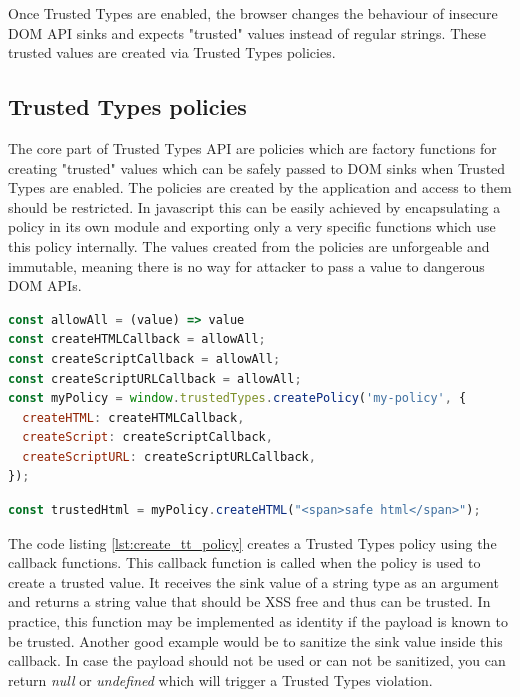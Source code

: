 Once Trusted Types are enabled, the browser changes the behaviour of insecure DOM API sinks and
expects "trusted" values instead of regular strings. These trusted values are created via Trusted
Types policies.

\subsection{Trusted Types policies}
\label{subsec:tt_policy}

The core part of Trusted Types API are policies which are factory functions for creating "trusted"
values which can be safely passed to DOM sinks when Trusted Types are enabled. The policies are
created by the application and access to them should be restricted. In javascript this can be easily
achieved by encapsulating a policy in its own module and exporting only a very specific functions
which use this policy internally. The values created from the policies are unforgeable and
immutable, meaning there is no way for attacker to pass a value to dangerous DOM APIs.

\bigskip
\begin{lstlisting}[language=JavaScript, caption=Creating a Trusted Types policy, label={lst:create_tt_policy}]
const allowAll = (value) => value
const createHTMLCallback = allowAll;
const createScriptCallback = allowAll;
const createScriptURLCallback = allowAll;
const myPolicy = window.trustedTypes.createPolicy('my-policy', {
  createHTML: createHTMLCallback,
  createScript: createScriptCallback,
  createScriptURL: createScriptURLCallback,
});
\end{lstlisting}

\bigskip
\begin{lstlisting}[language=JavaScript, caption=Create trusted value using a policy]
const trustedHtml = myPolicy.createHTML("<span>safe html</span>");
\end{lstlisting}

The code listing \ref{lst:create_tt_policy} creates a Trusted Types policy using the callback
functions. This callback function is called when the policy is used to create a trusted value. It
receives the sink value of a string type as an argument and returns a string value that should be
XSS free and thus can be trusted. In practice, this function may be implemented as identity if the
payload is known to be trusted. Another good example would be to sanitize the sink value inside this
callback. In case the payload should not be used or can not be sanitized, you can return
\textit{null} or \textit{undefined} which will trigger a Trusted Types violation.

